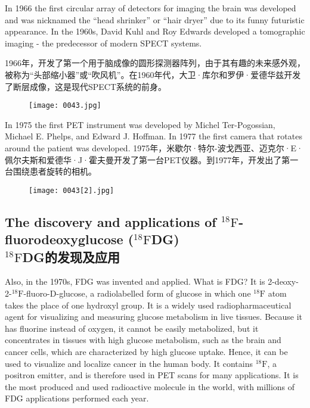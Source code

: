 \documentclass[dvipsnames, svgnames,a4paper,11pt]{article}
\begin{document}
In 1966 the first circular array of detectors for imaging the brain was developed and was nicknamed the “head shrinker” or “hair dryer” due to its funny futuristic appearance. In the 1960s, David Kuhl and Roy Edwards developed a tomographic imaging - the predecessor of modern SPECT systems.


1966年，开发了第一个用于脑成像的圆形探测器阵列，由于其有趣的未来感外观，被称为“头部缩小器”或“吹风机”。在1960年代，大卫·库尔和罗伊·爱德华兹开发了断层成像，这是现代SPECT系统的前身。
\begin{figure}[ht]
      \centering
      \texttt{[image: 0043.jpg]}
       \label{fig35}
\end{figure}


In 1975 the first PET instrument was developed by Michel Ter-Pogossian, Michael E. Phelps, and Edward J. Hoffman. In 1977 the first camera that rotates around the patient was developed.
1975年，米歇尔·特尔-波戈西亚、迈克尔·E·佩尔夫斯和爱德华·J·霍夫曼开发了第一台PET仪器。到1977年，开发出了第一台围绕患者旋转的相机。

\begin{figure}[h]
      \centering
      \texttt{[image: 0043[2].jpg]}
       \label{fig36}
\end{figure}

\subsection{The discovery and applications of ${}^\text{18}\text{F}$-fluorodeoxyglucose (${}^\text{18}\text{F}$DG) \\${}^\text{18}\text{F}$DG的发现及应用}

Also, in the 1970s, FDG was invented and applied. What is FDG? It is 2-deoxy-2-\(\mathrm{^{18}F}\)-fluoro-D-glucose, a radiolabelled form of glucose in which one \(\mathrm{^{18}F}\) atom takes the place of one hydroxyl group. It is a widely used radiopharmaceutical agent for visualizing and measuring glucose metabolism in live tissues. Because it has fluorine instead of oxygen, it cannot be easily metabolized, but it concentrates in tissues with high glucose metabolism, such as the brain and cancer cells, which are characterized by high glucose uptake. Hence, it can be used to visualize and localize cancer in the human body. It contains \(\mathrm{^{18}F}\), a positron emitter, and is therefore used in PET scans for many applications. It is the most produced and used radioactive molecule in the world, with millions of FDG applications performed each year.  
\end{document}
